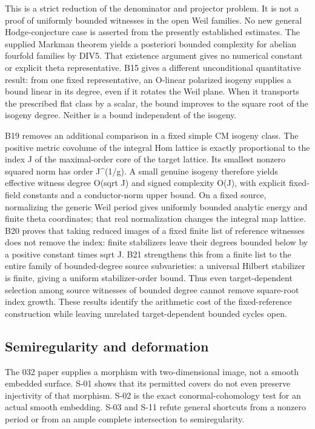 \documentclass[11pt,a4paper]{article}
\theoremstyle{definition}
\begin{document}
This is a strict reduction of the denominator and projector problem. It
is not a proof of uniformly bounded witnesses in the open Weil families.
No new general Hodge-conjecture case is asserted from the presently
established estimates. The supplied Markman theorem yields a posteriori
bounded complexity for abelian fourfold families by DIV5. That existence
argument gives no numerical constant or explicit theta representative.
B15 gives a different unconditional quantitative result: from one fixed
representative, an O-linear polarized isogeny supplies a bound linear in
its degree, even if it rotates the Weil plane. When it transports the
prescribed flat class by a scalar, the bound improves to the square root
of the isogeny degree. Neither is a bound independent of the isogeny.

B19 removes an additional comparison in a fixed simple CM isogeny class.
The positive metric covolume of the integral Hom lattice is exactly
proportional to the index J of the maximal-order core of the target
lattice. Its smallest nonzero squared norm has order J\^{}(1/g). A small
genuine isogeny therefore yields effective witness degree O(sqrt J) and
signed complexity O(J), with explicit fixed-field constants and a
conductor-norm upper bound. On a fixed source, normalizing the generic
Weil period gives uniformly bounded analytic energy and finite theta
coordinates; that real normalization changes the integral map lattice.
B20 proves that taking reduced images of a fixed finite list of
reference witnesses does not remove the index: finite stabilizers leave
their degrees bounded below by a positive constant times sqrt J. B21
strengthens this from a finite list to the entire family of
bounded-degree source subvarieties: a universal Hilbert stabilizer is
finite, giving a uniform stabilizer-order bound. Thus even
target-dependent selection among source witnesses of bounded degree
cannot remove square-root index growth. These results identify the
arithmetic cost of the fixed-reference construction while leaving
unrelated target-dependent bounded cycles open.

\subsection{Semiregularity and
deformation}\label{semiregularity-and-deformation}

The 032 paper supplies a morphism with two-dimensional image, not a
smooth embedded surface. S-01 shows that its permitted covers do not
even preserve injectivity of that morphism. S-02 is the exact
conormal-cohomology test for an actual smooth embedding. S-03 and S-11
refute general shortcuts from a nonzero period or from an ample complete
intersection to semiregularity.
\end{document}
